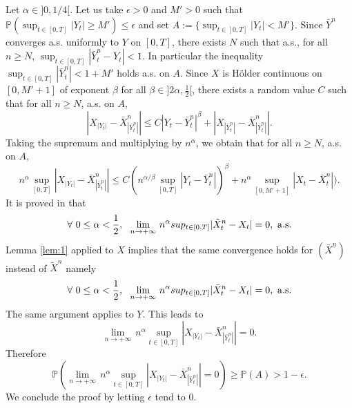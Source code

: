 \documentclass[a4paper, 11pt]{article}
\renewcommand{\P}{\mathbb{P}}
\newcommand{\1}{\mathbf{1}}
\begin{document}
\noindent Let $\alpha\in]0,1/4[$. Let us take $\epsilon>0$ and $M'>0$ such that $\P(\sup_{t\in [0,T]} |Y_t|\geq M')\leq \epsilon$ and set $A:=\{\sup_{t\in [0,T]} |Y_t|<M'\}$. Since $\bar{Y}^n$ converges a.s. uniformly to $Y$ on $[0,T]$, there exists $N$ such that a.s., for all $n\geq N$, $\sup_{t\in [0,T]} |\bar{Y}_t^n-Y_t|<1$. In particular the inequality $\sup_{t\in [0,T]} |\bar{Y}_t^n|<1+M'$ holds a.s. on $A$. Since $X$ is H\" older continuous on $[0,M'+1]$ of exponent $\beta$ for all $\beta\in]2\alpha,\frac{1}{2}[$, there exists a random value $C$ such that for all $n\geq N$, a.s. on $A$,
\begin{equation*}
|X_{|Y_t|}-\bar{X}^n_{|\bar{Y}_t^n|}|\leq C|Y_t-\bar{Y}_t^n|^\beta+ |X_{|\bar{Y}_t^n|}-\bar{X}^n_{|\bar{Y}_t^n|}|.
\end{equation*}
Taking the supremum and multiplying by $n^\alpha$, we obtain that for all $n\geq N$, a.s. on $A$, 
\begin{equation*}
n^\alpha \sup_{[0,T]} |X_{|Y_t|}-\bar{X}^n_{|\bar{Y}_t^n|}|\leq C(n^{\alpha/\beta} \sup_{[0,T]}|Y_t-\bar{Y}_t^n|)^\beta
+n^\alpha \sup_{[0,M'+1]}|X_t-\bar{X}_t^n|).
\end{equation*}
It is proved in \cite{faure} that
\begin{equation*}\label{cv1}
\forall \, \, 0\leq \alpha < \frac{1}{2}, \,  \, \, \,  \lim_{n\rightarrow +\infty}  \,  n^\alpha sup_{t\in [0,T]} {|\tilde{X}_t^n-X_t|}=0, \, \,  {\rm a.s.}
\end{equation*}
Lemma \ref{lem:1} applied to $X$ implies that the same convergence holds for $(\bar{X}^n)$ instead of $\tilde{X}^n$ namely
\begin{equation*}\label{cv2}
\forall \, \, 0\leq \alpha < \frac{1}{2}, \,  \, \, \,  \lim_{n\rightarrow +\infty}  \,  n^\alpha sup_{t\in [0,T]} {|\bar{X}_t^n-X_t|}=0, \, \,  {\rm a.s.}
\end{equation*}
The same argument applies to $Y$. This leads to 
\begin{equation*}
\lim_{n\rightarrow +\infty}  \, n^\alpha \sup_{t\in [0,T]} |X_{|Y_t|}-\bar{X}^n_{|\bar{Y}_t^n|}|=0.
\end{equation*}
Therefore
\begin{equation*}
\P\left(\lim_{n\rightarrow +\infty}  \, n^\alpha \sup_{t\in [0,T]} |X_{|Y_t|}-\bar{X}^n_{|\bar{Y}_t^n|}|=0\right)\geq \P(A)>1-\epsilon.
\end{equation*}
We conclude the proof by letting $\epsilon$ tend to $0$.
\hfill \framebox[0.6em]{}


\bigskip
\end{document}
